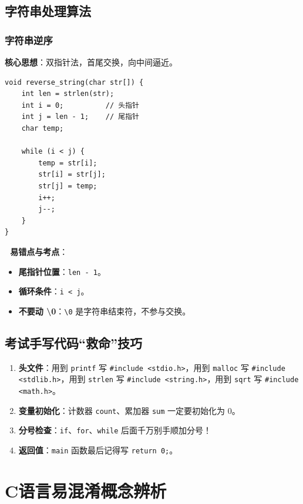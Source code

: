 \documentclass[a4paper,12pt]{article}
\begin{document}
\subsection{字符串处理算法}

\subsubsection{字符串逆序}
\textbf{核心思想}：双指针法，首尾交换，向中间逼近。

\begin{lstlisting}
void reverse_string(char str[]) {
    int len = strlen(str);
    int i = 0;          // 头指针
    int j = len - 1;    // 尾指针
    char temp;
    
    while (i < j) {
        temp = str[i];
        str[i] = str[j];
        str[j] = temp;
        i++;
        j--;
    }
}
\end{lstlisting}

\textbf{🔴 易错点与考点}：
\begin{itemize}
    \item \textbf{尾指针位置}：\texttt{len - 1}。
    \item \textbf{循环条件}：\texttt{i < j}。
    \item \textbf{不要动 \textbackslash 0}：\texttt{\textbackslash 0} 是字符串结束符，不参与交换。
\end{itemize}

\subsection{考试手写代码“救命”技巧}
\begin{enumerate}
    \item \textbf{头文件}：用到 \texttt{printf} 写 \texttt{\#include <stdio.h>}，用到 \texttt{malloc} 写 \texttt{\#include <stdlib.h>}，用到 \texttt{strlen} 写 \texttt{\#include <string.h>}，用到 \texttt{sqrt} 写 \texttt{\#include <math.h>}。
    \item \textbf{变量初始化}：计数器 \texttt{count}、累加器 \texttt{sum} 一定要初始化为 0。
    \item \textbf{分号检查}：\texttt{if}、\texttt{for}、\texttt{while} 后面千万别手顺加分号！
    \item \textbf{返回值}：\texttt{main} 函数最后记得写 \texttt{return 0;}。
\end{enumerate}

\section{C语言易混淆概念辨析}
\end{document}
